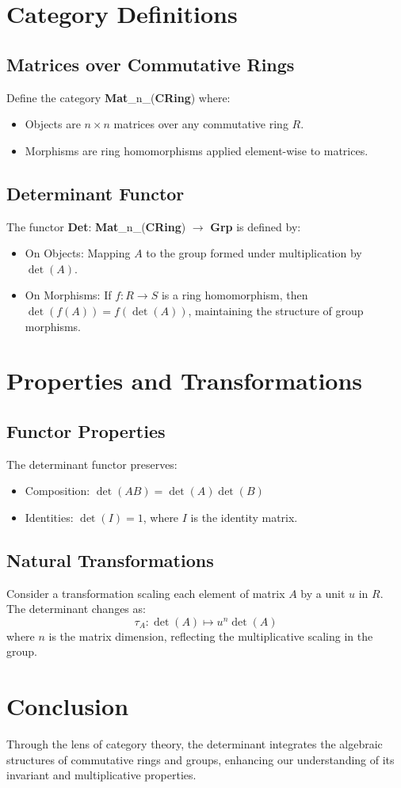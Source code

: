 \section{Category Definitions}
\subsection{Matrices over Commutative Rings}
Define the category \textbf{Mat}\_n\_(\textbf{CRing}) where:
\begin{itemize}
	\item Objects are \(n \times n\) matrices over any commutative ring \(R\).
	\item Morphisms are ring homomorphisms applied element-wise to matrices.
\end{itemize}

\subsection{Determinant Functor}
The functor \textbf{Det}: \textbf{Mat}\_n\_(\textbf{CRing}) \(\rightarrow\) \textbf{Grp} is defined by:
\begin{itemize}
	\item On Objects: Mapping \(A\) to the group formed under multiplication by \(\det(A)\).
	\item On Morphisms: If \(f: R \rightarrow S\) is a ring homomorphism, then \(\det(f(A)) = f(\det(A))\), maintaining the structure of group morphisms.
\end{itemize}

\section{Properties and Transformations}
\subsection{Functor Properties}
The determinant functor preserves:
\begin{itemize}
	\item Composition: \(\det(AB) = \det(A)\det(B)\)
	\item Identities: \(\det(I) = 1\), where \(I\) is the identity matrix.
\end{itemize}

\subsection{Natural Transformations}
Consider a transformation scaling each element of matrix \(A\) by a unit \(u\) in \(R\). The determinant changes as:
\[ \tau_A: \det(A) \mapsto u^n \det(A) \]
where \(n\) is the matrix dimension, reflecting the multiplicative scaling in the group.

\section{Conclusion}
Through the lens of category theory, the determinant integrates the algebraic structures of commutative rings and groups, enhancing our understanding of its invariant and multiplicative properties.
